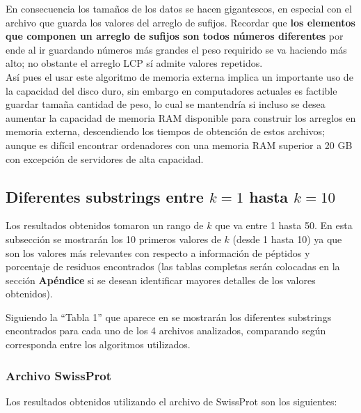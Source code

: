 En consecuencia los tamaños de los datos se hacen gigantescos, en especial con el archivo que guarda los valores del arreglo de sufijos. Recordar que \textbf{los elementos que componen un arreglo de sufijos son todos números diferentes} por ende al ir guardando números más grandes el peso requirido se va haciendo más alto; no obstante el arreglo LCP sí admite valores repetidos.\\
Así pues el usar este algoritmo de memoria externa implica un importante uso de la capacidad del disco duro, sin embargo en computadores actuales es factible guardar tamaña cantidad de peso, lo cual se mantendría si incluso se desea aumentar la capacidad de memoria RAM disponible para construir los arreglos en memoria externa, descendiendo los tiempos de obtención de estos archivos; aunque es difícil encontrar ordenadores con una memoria RAM superior a 20 GB con excepción de servidores de alta capacidad. 

\subsection{Diferentes substrings entre $k = 1$ hasta $k = 10$}

Los resultados obtenidos tomaron un rango de $k$ que va entre 1 hasta 50. En esta subsección se mostrarán los 10 primeros valores de $k$ (desde 1 hasta 10) ya que son los valores más relevantes con respecto a información de péptidos y porcentaje de residuos encontrados (las tablas completas serán colocadas en la sección \textbf{Apéndice} si se desean identificar mayores detalles de los valores obtenidos).

Siguiendo la ``Tabla 1'' que aparece en \cite{searching} se mostrarán los diferentes substrings encontrados para cada uno de los 4 archivos analizados, comparando según corresponda entre los algoritmos utilizados.

\subsubsection{Archivo SwissProt}

Los resultados obtenidos utilizando el archivo de SwissProt son los siguientes:

